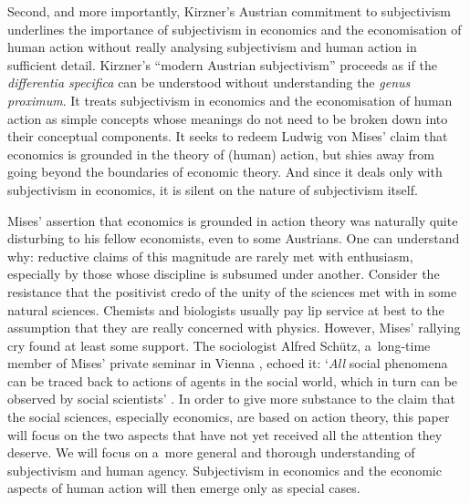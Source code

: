 Second, and more importantly, Kirzner's Austrian commitment to subjectivism underlines the importance of subjectivism in economics and the economisation of human action without really analysing subjectivism and human action in sufficient detail. Kirzner's ``modern Austrian subjectivism'' proceeds as if the \textit{differentia specifica} can be understood without understanding the \textit{genus proximum}. It treats subjectivism in economics and the economisation of human action as simple concepts whose meanings do not need to be broken down into their conceptual components. It seeks to redeem Ludwig von Mises' claim that economics is grounded in the theory of (human) action, but shies away from going beyond the boundaries of economic theory. And since it deals only with subjectivism in economics, it is silent on the nature of subjectivism itself.



Mises' assertion that economics is grounded in action theory was naturally quite disturbing to his fellow economists, even to some Austrians. One can understand why: reductive claims of this magnitude are rarely met with enthusiasm, especially by those whose discipline is subsumed under another. Consider the resistance that the positivist credo of the unity of the sciences met with in some natural sciences. Chemists and biologists usually pay lip service at best to the assumption that they are really concerned with physics. However, Mises' rallying cry found at least some support. The sociologist Alfred Schütz, a~long-time member of Mises' private seminar in Vienna 
\parencite[][p.5ff]{prendergast_alfred_1986}, %
 echoed it: ‘\textit{All} social phenomena can be traced back to actions of agents in the social world, which in turn can be observed by social scientists' 
\parencites[][p.96]{schutz_political_1996}[cf. 1953, p.26,][]{}[][p.122]{kurrild-klitgaard_rationality_2001}. %
 In order to give more substance to the claim that the social sciences, especially economics, are based on action theory, this paper will focus on the two aspects that have not yet received all the attention they deserve. We will focus on a~more general and thorough understanding of subjectivism and human agency. Subjectivism in economics and the economic aspects of human action will then emerge only as special cases.



